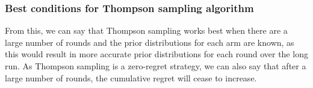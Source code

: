 \subsubsection{Best conditions for Thompson sampling algorithm}
From this, we can say that Thompson sampling works best when there are a large number of rounds and the prior distributions for each arm are known, as this would result in more accurate prior distributions for each round over the long run.
As Thompson sampling is a zero-regret strategy, we can also say that after a large number of rounds, the cumulative regret will cease to increase.

